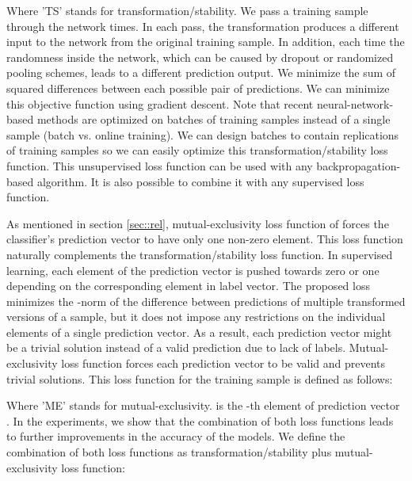 \documentclass{article}
\begin{document}
Where 'TS' stands for transformation/stability. We pass a training sample through the network  times. In each pass, the transformation  produces a different input to the network from the original training sample. In addition, each time the randomness inside the network, which can be caused by dropout or randomized pooling schemes, leads to a different prediction output. We minimize the sum of squared differences between each possible pair of predictions. We can minimize this objective function using gradient descent. Note that recent neural-network-based methods are optimized on batches of training samples instead of a single sample (batch vs. online training). We can design batches to contain replications of training samples so we can easily optimize this transformation/stability loss function. This unsupervised loss function can be used with any backpropagation-based algorithm. It is also possible to combine it with any supervised loss function. 

As mentioned in section \ref{sec::rel}, mutual-exclusivity loss function of \cite{mutualexclusive} forces the classifier's prediction vector to have only one non-zero element. This loss function naturally complements the transformation/stability loss function. In supervised learning, each element of the prediction vector is pushed towards zero or one depending on the corresponding element in label vector. The proposed loss minimizes the -norm of the difference between predictions of multiple transformed versions of a sample, but it does not impose any restrictions on the individual elements of a single prediction vector. As a result, each prediction vector might be a trivial solution instead of a valid prediction due to lack of labels. Mutual-exclusivity loss function forces each prediction vector to be valid and prevents trivial solutions. This loss function for the training sample  is defined as follows:

Where 'ME' stands for mutual-exclusivity.  is the -th element of prediction vector . In the experiments, we show that the combination of both loss functions leads to further improvements in the accuracy of the models. We define the combination of both loss functions as transformation/stability plus mutual-exclusivity loss function:
\end{document}
